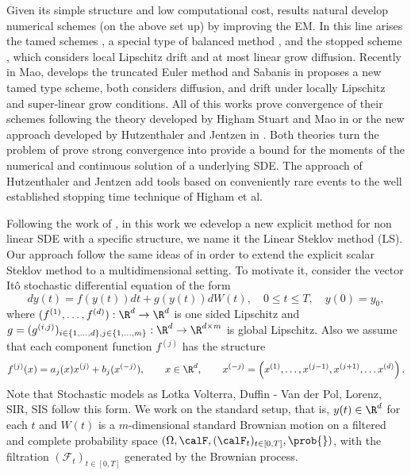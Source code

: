 \documentclass[sort&compress, preprint]{elsarticle}
\theoremstyle{definition}
\theoremstyle{plain}%
\theoremstyle{remark}
\newcommand{\SM}{LS\xspace}
\begin{document}
	Given its simple structure and low computational cost, results natural develop numerical schemes (on the
above set up) by improving the EM. In this line arises the tamed schemes
\cite{Hutzenthaler2012c, Hutzenthaler2015, Wang2011, Sabanis2013, Zong2014}, a special type of balanced method 
\cite{Tretyakov2013b}, and the stopped scheme \cite{Liu2013a}, which considers local Lipschitz drift and at most linear 
grow diffusion. Recently in \cite{Mao2015} Mao, develops the truncated Euler method and  Sabanis in \cite{Sabanis2015} 
proposes a new tamed type scheme, both considers diffusion, and drift under locally Lipschitz and super-linear grow 
conditions. All of this works  prove  convergence  of their schemes following the theory developed by Higham Stuart and 
Mao in \cite{Higham2002b} or the new approach developed by  Hutzenthaler and Jentzen in \cite{Hutzenthaler2015}.
Both theories turn the problem of prove strong convergence into provide a bound for the moments of the numerical and 
continuous solution of a underlying SDE. The approach of Hutzenthaler and Jentzen add tools based on conveniently 
rare events to the well established stopping time technique of Higham et al.

	Following the work of \citeauthor*{Higham2002b}, in this work we edevelop a new explicit method for non linear SDE 
with a specific structure, we name it the Linear Steklov method (\SM). Our approach follow the same ideas of 
\cite{Diaz-Infante2015} in order to extend the explicit scalar Steklov method to a multidimensional setting. To
 motivate it, consider the  vector It\^o stochastic differential equation of the form
\begin{equation}\label{eqn:SDE1}
	dy(t)
	 =f(y(t))dt + g(y(t))dW(t), \quad 0\leq t\leq T,
	\quad y(0)=y_0,
\end{equation}
where $(f^{(1)},\dots, f^{(d)}):\R^d \to \R^d$ is one sided Lipschitz and 
$g = (g^{(i,j)})_{i\in \{1,\dots,d\}, j\in\{1,\dots, m\}}:\R^d \to \R^{d\times m}$ is global Lipschitz. Also we assume 
that  each component function $f^{(j)}$  has the structure
$$
	f^{(j)}(x) = a_j(x) x^{(j)} + b_j (x^{(-j)}), \qquad x\in \R^d, \qquad 
	x^{(-j)} = \left( x^{(1)},\dots,x^{(j-1)},x^{(j+1)},\dots x^{(d)}\right).
$$ 
Note that Stochastic models as Lotka Volterra, Duffin - Van der Pol, Lorenz, SIR, SIS follow this form. 
We work on the standard setup, that is,  $y(t)\in \R^d$ for each $t$ and  $W(t)$ is a
$m$-dimensional standard Brownian motion on a filtered and complete probability space
$
	(
		\Omega ,\calF,(\calF_t)_{t\in[0,T]},\prob{}
	)
$,
with the filtration
$(\mathcal{F}_t)_{t\in[0,T]}$  generated by the Brownian process.
\end{document}
